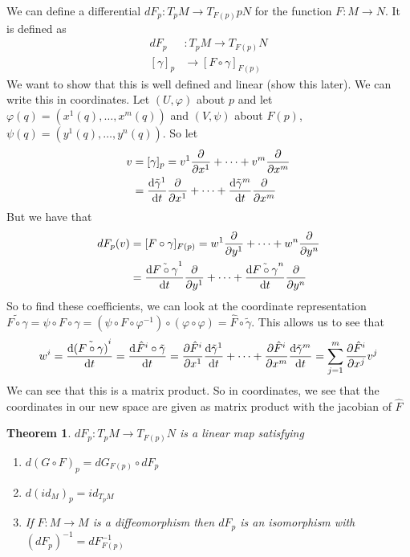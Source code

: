 \documentclass[a4paper]{article}
\newtheorem*{thm}{Theorem}
\begin{document}
We can define a differential $dF_p: T_pM \rightarrow T_{F(p)}pN$ for the function $F: M \rightarrow N$.  It is defined as
\[
  \begin{aligned}
    dF_p&: T_pM \rightarrow T_{F(p)}N \\
    [\gamma]_p& \rightarrow [F \circ \gamma]_{F(p)}
  \end{aligned}
\]
We want to show that this is well defined and linear (show this later). We can write this in coordinates. Let $(U, \varphi)$ about $p$ and let $\varphi(q) = (x^1(q), \dots, x^m(q))$ and $(V, \psi)$ about $F(p)$, $\psi(q) = (y^1(q), \dots, y^n(q))$. So let
\[
  \begin{aligned}
    v &= [\gamma]_p = v^1 \pdv{}{x^1} + \cdots + v^m \pdv{}{x^m}\\
      &=\dv{\tilde{\gamma}^1}{t} \pdv{}{x^1} + \cdots +  \dv{\tilde{\gamma}^m}{t}\pdv{}{x^m}\\
  \end{aligned}
\]
But we have that
\[
  \begin{aligned}
    dF_p(v) &= [F \circ \gamma]_{F(p)} = w^1 \pdv{}{y^1} + \cdots + w^n \pdv{}{y^n} \\
            &= \dv{\tilde{F \circ \gamma}^1}{t} \pdv{}{y^1} + \cdots + \dv{\tilde{F \circ \gamma}^n}{t} \pdv{}{y^n} \\
  \end{aligned}
\]
So to find these coefficients, we can look at the coordinate representation $\tilde{F \circ \gamma} = \psi \circ F \circ \gamma = (\psi \circ F \circ \varphi^{-1}) \circ (\varphi \circ \varphi) = \hat{F} \circ \tilde{\gamma}$. This allows us to see that
\[
  w^i = \dv{\tilde{(F \circ \gamma)}^i}{t} = \dv[]{\hat{F}^i \circ \tilde{\gamma}}{t} = 
  \pdv{\hat{F}^i}{x^1} \dv{\tilde{\gamma}^1}{t} + \cdots + \pdv{\hat{F}^i}{x^m} \dv{\tilde{\gamma}^m}{t} = \sum_{j=1}^m \pdv{\hat{F}^i}{x^j}v^j
\]
We can see that this is a matrix product. So in coordinates, we see that the coordinates in our new space are given as matrix product with the jacobian of $\hat{F}$

\begin{thm}
  $dF_p: T_pM \rightarrow T_{F(p)}N$ is a linear map satisfying
  \begin{enumerate}
    \item $d(G \circ F)_p = dG_{F(p)} \circ dF_p$
    \item $d(id_M)_p = id_{T_pM}$
    \item If $F: M \rightarrow M$ is a diffeomorphism then $dF_p$ is an isomorphism with $(dF_p)^{-1} = dF^{-1}_{F(p)}$
  \end{enumerate}
\end{thm}
\end{document}
